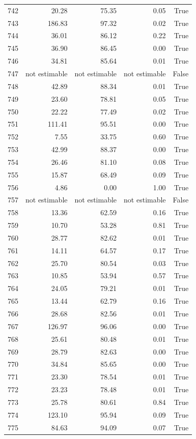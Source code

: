 \begin{longtable}{rrrrr}
742 & 20.28 & 75.35 & 0.05 & True \\
743 & 186.83 & 97.32 & 0.02 & True \\
744 & 36.01 & 86.12 & 0.22 & True \\
745 & 36.90 & 86.45 & 0.00 & True \\
746 & 34.81 & 85.64 & 0.01 & True \\
747 & not estimable & not estimable & not estimable & False \\
748 & 42.89 & 88.34 & 0.01 & True \\
749 & 23.60 & 78.81 & 0.05 & True \\
750 & 22.22 & 77.49 & 0.02 & True \\
751 & 111.41 & 95.51 & 0.00 & True \\
752 & 7.55 & 33.75 & 0.60 & True \\
753 & 42.99 & 88.37 & 0.00 & True \\
754 & 26.46 & 81.10 & 0.08 & True \\
755 & 15.87 & 68.49 & 0.09 & True \\
756 & 4.86 & 0.00 & 1.00 & True \\
757 & not estimable & not estimable & not estimable & False \\
758 & 13.36 & 62.59 & 0.16 & True \\
759 & 10.70 & 53.28 & 0.81 & True \\
760 & 28.77 & 82.62 & 0.01 & True \\
761 & 14.11 & 64.57 & 0.17 & True \\
762 & 25.70 & 80.54 & 0.03 & True \\
763 & 10.85 & 53.94 & 0.57 & True \\
764 & 24.05 & 79.21 & 0.01 & True \\
765 & 13.44 & 62.79 & 0.16 & True \\
766 & 28.68 & 82.56 & 0.01 & True \\
767 & 126.97 & 96.06 & 0.00 & True \\
768 & 25.61 & 80.48 & 0.01 & True \\
769 & 28.79 & 82.63 & 0.00 & True \\
770 & 34.84 & 85.65 & 0.00 & True \\
771 & 23.30 & 78.54 & 0.01 & True \\
772 & 23.23 & 78.48 & 0.01 & True \\
773 & 25.78 & 80.61 & 0.84 & True \\
774 & 123.10 & 95.94 & 0.09 & True \\
775 & 84.63 & 94.09 & 0.07 & True \\

\end{longtable}
